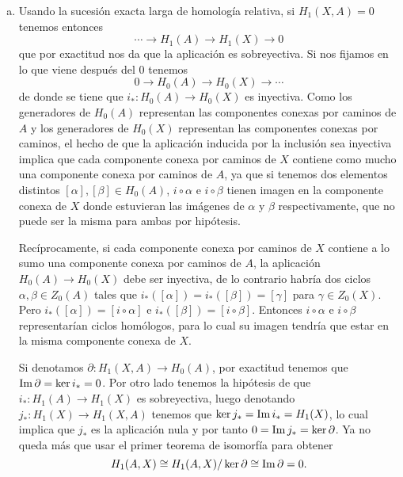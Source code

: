 \documentclass[twoside]{article}
\begin{document}
\begin{solucion}
\begin{enumerate}[(a)]
\item Usando la sucesión exacta larga de homología relativa, si $H_1(X,A)=0$ tenemos entonces
\[
\cdots\to H_1(A)\to H_1(X)\to 0
\]
que por exactitud nos da que la aplicación es sobreyectiva. Si nos fijamos en lo que viene después del 0 tenemos
\[
0\to H_0(A)\to H_0(X)\to\cdots
\]
de donde se tiene que $i_*:H_0(A)\to H_0(X)$ es inyectiva. Como los generadores de $H_0(A)$ representan las componentes conexas por caminos de $A$ y los generadores de $H_0(X)$ representan las componentes conexas por caminos, el hecho de que la aplicación inducida por la inclusión sea inyectiva implica que cada componente conexa por caminos de $X$ contiene como mucho una componente conexa por caminos de $A$, ya que si tenemos dos elementos distintos $[\alpha],[\beta]\in H_0(A)$, $i\circ\alpha$ e $i\circ\beta$ tienen imagen en la componente conexa de $X$ donde estuvieran las imágenes de $\alpha$ y $\beta$ respectivamente, que no puede ser la misma para ambas por hipótesis. 

Recíprocamente, si cada componente conexa por caminos de $X$ contiene a lo sumo una componente conexa por caminos de $A$, la aplicación $H_0(A)\to H_0(X)$ debe ser inyectiva, de lo contrario habría dos ciclos $\alpha,\beta\in Z_0(A)$ tales que $i_*([\alpha])=i_*([\beta])=[\gamma]$ para $\gamma\in Z_0(X)$. Pero $i_*([\alpha])=[i\circ\alpha]$ e $i_*([\beta])=[i\circ\beta]$. Entonces $i\circ\alpha$ e $i\circ\beta$ representarían ciclos homólogos, para lo cual su imagen tendría que estar en la misma componente conexa de $X$. 

Si denotamos $\partial:H_1(X,A)\to H_0(A)$, por exactitud tenemos que $\operatorname{Im}\partial=\ker i_*=0$. Por otro lado tenemos la hipótesis de que $i_*:H_1(A)\to H_1(X)$ es sobreyectiva, luego denotando $j_*:H_1(X)\to H_1(X,A)$ tenemos que $\ker j_*=\operatorname{Im} i_*=H_1(X)$, lo cual implica que $j_*$ es la aplicación nula y por tanto $0=\operatorname{Im} j_*=\ker\partial$. Ya no queda más que usar el primer teorema de isomorfía para obtener $$H_1(A,X)\cong H_1(A,X)/\ker\partial\cong \operatorname{Im}\partial=0.$$
\end{enumerate}
\end{solucion}
\end{document}
